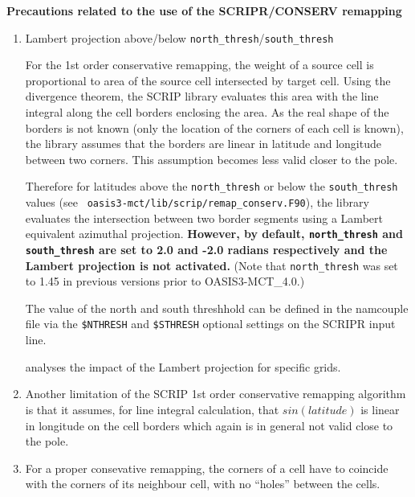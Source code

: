 \begin{itemize}
\begin{itemize}
  \end{itemize}

  {\bf Precautions related to the use of the SCRIPR/CONSERV remapping}
 \begin{enumerate}
 
  \item Lambert projection above/below {\tt north\_thresh}/{\tt south\_thresh}
    
    For the 1st order conservative remapping, the weight of a
    source cell is proportional to area of the source cell intersected
    by target cell.  Using the divergence theorem, the SCRIP library
    evaluates this area with the line integral along the cell borders
    enclosing the area. As the real shape of the borders is not known
    (only the location of the corners of each cell is known), the
    library assumes that the borders are linear in latitude and
    longitude between two corners.  This assumption becomes less valid
    closer to the pole. 
    
    Therefore for latitudes above the {\tt north\_thresh}
    or below the {\tt south\_thresh} values (see {\tt
      oasis3-mct/lib/scrip/remap\_conserv.F90}), the library evaluates
    the intersection between two border segments using a Lambert
    equivalent azimuthal projection.  {\bf However, by default, {\tt \bf north\_thresh} and
    {\tt \bf south\_thresh} are set to 2.0 and -2.0 radians respectively and the Lambert projection is not activated.} 
    (Note that {\tt north\_thresh} was set to 1.45 in previous versions prior to OASIS3-MCT\_4.0.)

    The value of the north and south threshhold can be defined in the 
    namcouple file via the {\tt \$NTHRESH} and {\tt \$STHRESH} optional settings
    on the SCRIPR input line.
    
    \cite{valcke19} analyses the impact of the Lambert projection for specific grids.
  
  \item Another limitation of the SCRIP 1st order conservative
    remapping algorithm is that it assumes, for line integral
    calculation, that $sin(latitude)$ is linear in longitude on the
    cell borders which again is in general not valid close to the
    pole.

  \item For a proper consevative remapping, the corners of a cell have
    to coincide with the corners of its neighbour cell, with no
    ``holes'' between the cells.
  

\end{enumerate}
\end{itemize}
